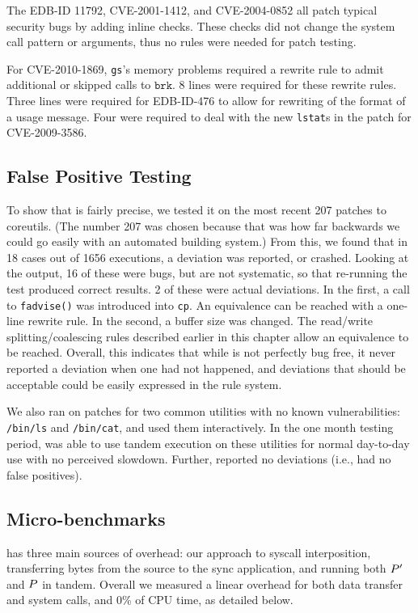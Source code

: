 The EDB-ID 11792, CVE-2001-1412, and CVE-2004-0852 all patch typical
security bugs by adding inline checks. These checks did not change the
system call pattern or arguments, thus no rules were needed for patch
testing.

For CVE-2010-1869, \texttt{gs}'s memory problems required a rewrite rule
to admit additional or skipped calls to $\texttt{brk}$.
8 lines were required for these rewrite rules. Three lines were required
for EDB-ID-476 to allow for rewriting of the format of a usage
message. Four were required to deal with the new \texttt{lstat}s in the patch for CVE-2009-3586.

\subsection{False Positive Testing}
To show that \tachyon is fairly precise, we tested it on the most recent 207 patches to coreutils. (The number 207 was chosen because that was how far backwards we could go easily with an automated building system.) From this, we found that in 18 cases out of 1656 executions, a deviation was reported, or \tachyon crashed. Looking at the output, 16 of these were \tachyon bugs, but are not systematic, so that re-running the test produced correct results. 2 of these were actual deviations. In the first, a call to \texttt{fadvise()} was introduced into \texttt{cp}. An equivalence can be reached with a one-line rewrite rule. In the second, a buffer size was changed. The read/write splitting/coalescing rules described earlier in this chapter allow an equivalence to be reached. Overall, this indicates that while \tachyon is not perfectly bug free, it never reported a deviation when one had not happened, and deviations that should be acceptable could be easily expressed in the rule system.

We also ran \tachyon on patches for two common utilities with no known
vulnerabilities:
\texttt{/bin/ls} and \texttt{/bin/cat}, and used them interactively.
In the one month testing period, \tachyon was able to use tandem
execution on these utilities for normal day-to-day use with no
perceived slowdown. Further, \tachyon
reported no deviations (i.e., had no false positives).

\subsection{Micro-benchmarks}


\tachyon has three main sources of overhead: our approach to syscall
interposition, transferring bytes from the source to the sync
application, and running both $P'$ and $P$
in tandem. Overall we measured a linear overhead for both data transfer and
system calls, and 0\% of CPU time, as detailed below.



